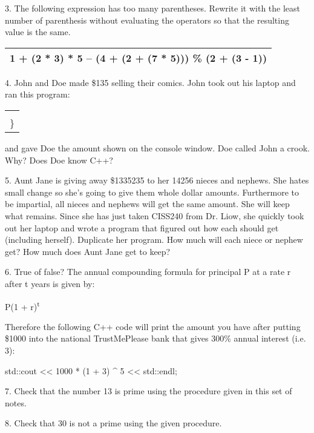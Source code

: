 \documentclass[
]{article}
\begin{document}
3. The following expression has too many parentheses. Rewrite it with
the least number of parenthesis without evaluating the operators so that
the resulting value is the same.

\begin{longtable}[]{@{}l@{}}
\toprule
\endhead
1 + (2 * 3) * 5 -- (4 + (2 + (7 * 5))) \% (2 + (3 - 1))\tabularnewline
\bottomrule
\end{longtable}

4. John and Doe made \$135 selling their comics. John took out his
laptop and ran this program:

\begin{longtable}[]{@{}l@{}}
\toprule
\endhead
\begin{minipage}[t]{0.97\columnwidth}\raggedright
\#include \textless iostream\textgreater{}

int main()

\{

std::cout \textless\textless{} 135 / 2 \textless\textless{} std::endl;

return 0;\\
\}\strut
\end{minipage}\tabularnewline
\bottomrule
\end{longtable}

and gave Doe the amount shown on the console window. Doe called John a
crook. Why? Does Doe know C++?

5. Aunt Jane is giving away \$1335235 to her 14256 nieces and nephews.
She hates small change so she's going to give them whole dollar amounts.
Furthermore to be impartial, all nieces and nephews will get the same
amount. She will keep what remains. Since she has just taken CISS240
from Dr. Liow, she quickly took out her laptop and wrote a program that
figured out how each should get (including herself). Duplicate her
program. How much will each niece or nephew get? How much does Aunt Jane
get to keep?

6. True of false? The annual compounding formula for principal P at a
rate r after t years is given by:

P(1 + r)\textsuperscript{t}

Therefore the following C++ code will print the amount you have after
putting \$1000 into the national TrustMePlease bank that gives 300\%
annual interest (i.e. 3):

std::cout \textless\textless{} 1000 * (1 + 3) \^{} 5
\textless\textless{} std::endl;

7. Check that the number 13 is prime using the procedure given in this
set of notes.

8. Check that 30 is not a prime using the given procedure.
\end{document}
